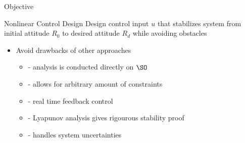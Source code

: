 \begin{frame}{Objective} %

  \begin{block}{Nonlinear Control Design}
    Design control input \( u \) that stabilizes system from initial attitude \( R_0 \) to desired attitude \( R_d \) while avoiding obstacles
  \end{block}
  \pause
  \vs
  \begin{itemize}
    \item Avoid drawbacks of other approaches 
    \begin{itemize}
      \item {} - analysis is conducted directly on \( \SO \) 
      \item {} - allows for arbitrary amount of constraints
      \item {} - real time feedback control
      \item {} - Lyapunov analysis gives rigourous stability proof
      \item {} - handles system uncertainties
    \end{itemize}
  \end{itemize}
\end{frame}